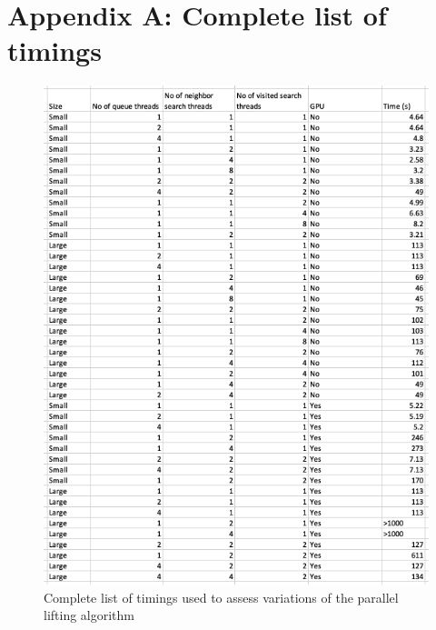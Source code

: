 \documentclass{article}
\begin{document}
\pagebreak

\section{Appendix A: Complete list of timings}
\begin{figure}[htp!]
    \includegraphics[scale=0.8]{timings.png}
    \caption{Complete list of timings used to assess variations of the parallel lifting algorithm}
    \centering
    \label{fig:recontruction}
\end{figure}
\end{document}
